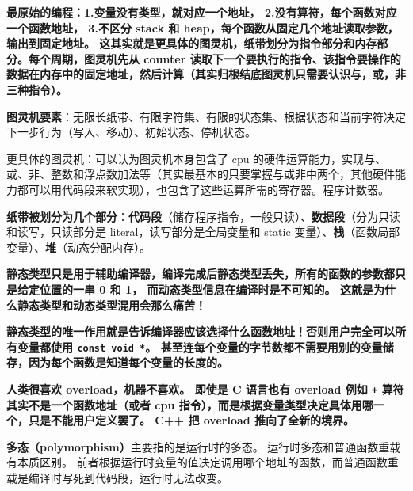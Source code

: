 
\begin{issues}
\issueDraft
\end{issues}

\textbf{最原始的编程：1.变量没有类型，就对应一个地址， 2.没有算符，每个函数对应一个函数地址， 3.不区分 stack 和 heap，每个函数从固定几个地址读取参数，输出到固定地址。 这其实就是更具体的图灵机，纸带划分为指令部分和内存部分。每个周期，图灵机先从 counter 读取下一个要执行的指令、该指令要操作的数据在内存中的固定地址，然后计算（其实归根结底图灵机只需要认识与，或，非三种指令）。}

\textbf{图灵机要素}：无限长纸带、有限字符集、有限的状态集、根据状态和当前字符决定下一步行为（写入、移动）、初始状态、停机状态。

更具体的图灵机：可以认为图灵机本身包含了 cpu 的硬件运算能力，实现与、或、非、整数和浮点数加法等（其实最基本的只要掌握与或非中两个，其他硬件能力都可以用代码段来软实现），也包含了这些运算所需的寄存器。程序计数器。

\textbf{纸带被划分为几个部分}：\textbf{代码段}（储存程序指令，一般只读）、\textbf{数据段}（分为只读和读写，只读部分是 literal，读写部分是全局变量和 static 变量）、\textbf{栈}（函数局部变量）、\textbf{堆}（动态分配内存）。

\textbf{静态类型只是用于辅助编译器，编译完成后静态类型丢失，所有的函数的参数都只是给定位置的一串 0 和 1， 而动态类型信息在编译时是不可知的。 这就是为什么静态类型和动态类型混用会那么痛苦！}

\textbf{静态类型的唯一作用就是告诉编译器应该选择什么函数地址！否则用户完全可以所有变量都使用 \verb`const void *`。 甚至连每个变量的字节数都不需要用别的变量储存，因为每个函数是知道每个变量的长度的。}

\textbf{人类很喜欢 overload，机器不喜欢。 即使是 C 语言也有 overload 例如 \verb`+` 算符其实不是一个函数地址（或者 cpu 指令），而是根据变量类型决定具体用哪一个，只是不能用户定义罢了。 C++ 把 overload 推向了全新的境界。}

\textbf{多态（polymorphism）}主要指的是运行时的多态。 运行时多态和普通函数重载有本质区别。 前者根据运行时变量的值决定调用哪个地址的函数，而普通函数重载是编译时写死到代码段，运行时无法改变。

